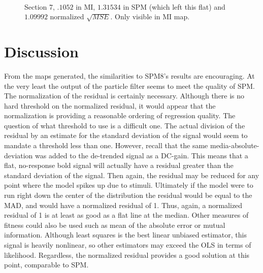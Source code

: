 \begin{figure}
\\
\caption{Section 7, $.1052$ in MI, $1.31534$ in SPM (which left this flat) and $1.09992$ normalized $\sqrt{MSE}$. Only visible in MI map. }
\label{fig:comp5}
\end{figure}

\section{Discussion}
From the maps generated, the similarities to SPM8's results are encouraging. At the 
very least the output of the particle filter seems to meet the quality of SPM. The normalization
of the residual is certainly necessary. Although there is no hard threshold on the 
normalized residual, it would appear that the normalization is providing a reasonable
ordering of regression quality. The question of what threshold to use is a difficult one.
The actual division of the residual by an estimate for the standard deviation
of the signal would seem to mandate a threshold less than one. However, recall that the 
same media-absolute-deviation was added to the de-trended signal as a DC-gain. This means
that a flat, no-response bold signal will actually have a residual greater than the standard 
deviation of the signal. Then again, the residual may be reduced for any point where the 
model spikes up due to stimuli. Ultimately if the model were to run right down the 
center of the distribution the residual would be equal to the MAD, and would have a 
normalized residual of 1. Thus, again, a normalized residual of 1 is at least as 
good as a flat line at the median. 
Other measures of fitness could also be used such as mean of the absolute error or 
mutual information. Although least squares is the best linear unbiased estimator,
this signal is heavily nonlinear, so other estimators may exceed the OLS in terms
of likelihood. Regardless, the normalized residual provides a good solution at this
point, comparable to SPM.
